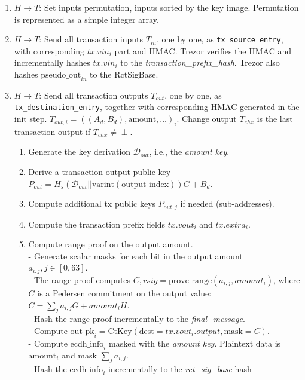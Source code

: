 \documentclass[]{article}
\begin{document}
\begin{enumerate}
	\item $H \rightarrow T$: Set inputs permutation, inputs sorted by the key image. Permutation is represented as a simple integer array.
	
	\item $H \rightarrow T$: Send all transaction inputs $T_{in}$, one by one, as \verb|tx_source_entry|, with corresponding $tx.vin_i$ part and HMAC. Trezor verifies the HMAC and incrementally hashes $tx.vin_i$ to the \emph{transaction\_prefix\_hash}. Trezor also hashes $\text{pseudo\_out}_{in}$ to the RctSigBase.
	
	\item $H \rightarrow T$: Send all transaction outputs $T_{out}$, one by one, as \verb|tx_destination_entry|, together with corresponding HMAC generated in the init step. $T_{out,i} = ((A_d, B_d), \text{amount}, \dots)_i$. Change output $T_{chx}$ is the last transaction output if $T_{chx} \neq \perp$.
	\begin{enumerate}			
		\item Generate the key derivation $\mathcal{D}_{out}$, i.e., the \emph{amount key}.
		
		\item Derive a transaction output public key $P_{out} = H_s(\mathcal{D}_{out} || \text{varint}(\text{output\_index}))G + B_d$.
		
		\item Compute additional tx public keys $P_{out,j}$ if needed (sub-addresses).
		
        \item Compute the transaction prefix fields $tx.vout_i$ and $tx.extra_i$.
        
        \item Compute range proof on the output amount. \\
        - Generate scalar masks for each bit in the output amount $a_{i, j}, j \in [0, 63]$. \\
        - The range proof computes $C, rsig = \text{prove\_range}(a_{i, j}, amount_i)$, where $C$ is a Pedersen commitment on the output value: $C = \sum_{j}a_{i, j} G + amount_i H$. \\
        - Hash the range proof incrementally to the \emph{final\_message}.\\
        - Compute $\text{out\_pk}_i = \text{CtKey}(\text{dest}=tx.vout_i.output,\text{mask}=C)$.\\  
        - Compute $\text{ecdh\_info}_i$ masked with the \emph{amount key}. Plaintext data is $\text{amount}_i$ and mask $\sum_{j}a_{i, j}$. \\ \medskip
        - Hash the $\text{ecdh\_info}_i$ incrementally to the \emph{rct\_sig\_base} hash


\end{enumerate}
\end{enumerate}
\end{document}
